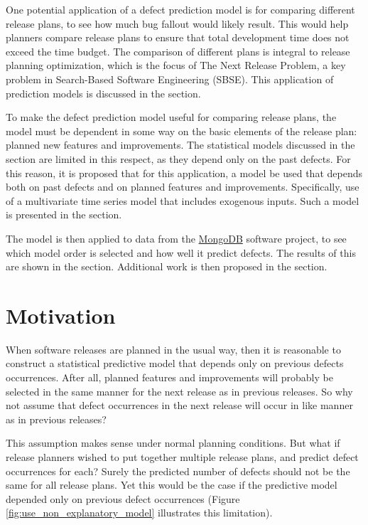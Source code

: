 \documentclass[a4paper]{scrartcl}
\begin{document}
One potential application of a defect prediction model is for comparing different release plans, to see how much bug fallout would likely result. This would help planners compare release plans to ensure that total development time does not exceed the time budget. The comparison of different plans is integral to release planning optimization, which is the focus of The Next Release Problem, a key problem in Search-Based Software Engineering (SBSE). This application of prediction models is discussed in the  section.

To make the defect prediction model useful for comparing release plans, the model must be dependent in some way on the basic elements of the release plan: planned new features and improvements. The statistical models discussed in the  section are limited in this respect, as they depend only on the past defects. For this reason, it is proposed that for this application, a model be used that depends both on past defects and on planned features and improvements. Specifically, use of a multivariate time series model that includes exogenous inputs. Such a model is presented in the  section.

The model is then applied to data from the \href{https://www.mongodb.org}{MongoDB} software project, to see which model order is selected and how well it predict defects. The results of this are shown in the  section. Additional work is then proposed in the  section.

\section*{Motivation}
\label{sec:motivation}

When software releases are planned in the usual way, then it is reasonable to construct a statistical predictive model that depends only on previous defects occurrences. After all, planned features and improvements will probably be selected in the same manner for the next release as in previous releases. So why not assume that defect occurrences in the next release will occur in like manner as in previous releases?

This assumption makes sense under normal planning conditions. But what if release planners wished to put together multiple release plans, and predict defect occurrences for each? Surely the predicted number of defects should not be the same for all release plans. Yet this would be the case if the predictive model depended only on previous defect occurrences (Figure \ref{fig:use_non_explanatory_model} illustrates this limitation).
\end{document}
